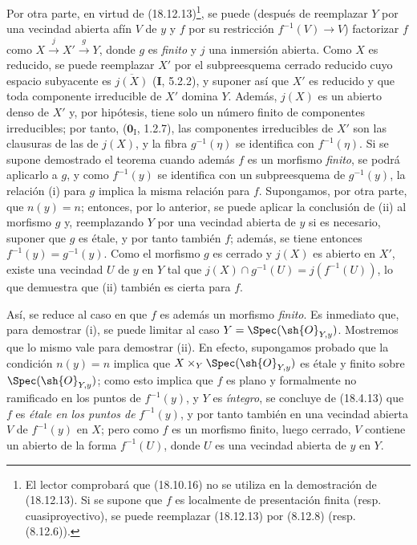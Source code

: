 Por otra parte, en virtud de (18.12.13)\footnote{El lector comprobará que (18.10.16) no se utiliza en la demostración de (18.12.13). Si se supone que $f$ es localmente de presentación finita (resp. cuasiproyectivo), se puede reemplazar (18.12.13) por (8.12.8) (resp. (8.12.6)).}, se puede (después de reemplazar $Y$ por una vecindad abierta afín $V$ de $y$ y $f$ por su restricción $f^{-1}(V)\to V$) factorizar $f$ como $X\xrightarrow{j}X'\xrightarrow{g}Y$, donde $g$ es \emph{finito} y $j$ una inmersión abierta. Como $X$ es reducido, se puede reemplazar $X'$ por el subpreesquema cerrado reducido cuyo espacio subyacente es $\overline{j(X)}$ (\textbf I, 5.2.2), y suponer así que $X'$ es reducido y que toda componente irreducible de $X'$ domina $Y$. Además, $j(X)$ es un abierto denso de $X'$ y, por hipótesis, tiene solo un número finito de componentes irreducibles; por tanto, ($\mathbf{0}_{\mathrm I}$, 1.2.7), las componentes irreducibles de $X'$ son las clausuras de las de $j(X)$, y la fibra $g^{-1}(\eta)$ se identifica con $f^{-1}(\eta)$. Si se supone demostrado el teorema cuando además $f$ es un morfismo \emph{finito}, se podrá aplicarlo a $g$, y como $f^{-1}(y)$ se identifica con un subpreesquema de $g^{-1}(y)$, la relación (i) para $g$ implica la misma relación para $f$. Supongamos, por otra parte, que $n(y)=n$; entonces, por lo anterior, se puede aplicar la conclusión de (ii) al morfismo $g$ y, reemplazando $Y$ por una vecindad abierta de $y$ si es necesario, suponer que $g$ es étale, y por tanto también $f$; además, se tiene entonces $f^{-1}(y)=g^{-1}(y)$. Como el morfismo $g$ es cerrado y $j(X)$ es abierto en $X'$, existe una vecindad $U$ de $y$ en $Y$ tal que $j(X)\cap g^{-1}(U)=j(f^{-1}(U))$, lo que demuestra que (ii) también es cierta para $f$.

Así, se reduce al caso en que $f$ es además un morfismo \emph{finito}. Es inmediato que, para demostrar (i), se puede limitar al caso $Y=\Spec(\sh{O}_{Y,y})$. Mostremos que lo mismo vale para demostrar (ii). En efecto, supongamos probado que la condición $n(y)=n$ implica que $X\times_Y\Spec(\sh{O}_{Y,y})$ es étale y finito sobre $\Spec(\sh{O}_{Y,y})$; como esto implica que $f$ es plano y formalmente no ramificado en los puntos de $f^{-1}(y)$, y $Y$ es \emph{íntegro}, se concluye de (18.4.13) que $f$ es \emph{étale en los puntos de} $f^{-1}(y)$, y por tanto también en una vecindad abierta $V$ de $f^{-1}(y)$ en $X$; pero como $f$ es un morfismo finito, luego cerrado, $V$ contiene un abierto de la forma $f^{-1}(U)$, donde $U$ es una vecindad abierta de $y$ en $Y$.

